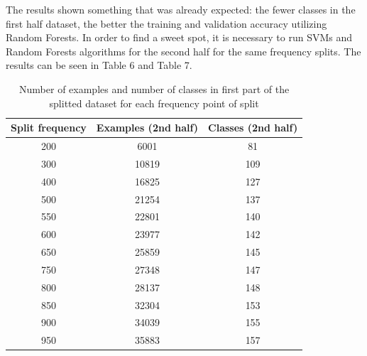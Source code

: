 \documentclass[10pt,twocolumn,letterpaper]{article}
\begin{document}
The results shown something that was already expected: the fewer classes in the first half dataset, the better the training and validation accuracy utilizing Random Forests. In order to find a sweet spot, it is necessary to run SVMs and Random Forests algorithms for the second half for the same frequency splits. The results can be seen in Table 6 and Table 7.

\begin{table}[h!]
  \begin{center}
    \label{tab:freq_splitted_second}
    \begin{tabular}{c|c|c} %
      \textbf{Split frequency} & \textbf{Examples (2nd half)} & \textbf{Classes (2nd half)}\\
      \hline
      200 & 6001 & 81\\
      300 & 10819 & 109\\
      400 & 16825 & 127\\
      500 & 21254 & 137\\
      550 & 22801 & 140\\
      600 & 23977 & 142\\
      650 & 25859 & 145\\
      750 & 27348 & 147\\
      800 & 28137 & 148\\
      850 & 32304 & 153\\
      900 & 34039 & 155\\
      950 & 35883 & 157\\
    \end{tabular}
    \caption{Number of examples and number of classes in first part of the splitted dataset for each frequency point of split}
  \end{center}
\end{table}
\end{document}
